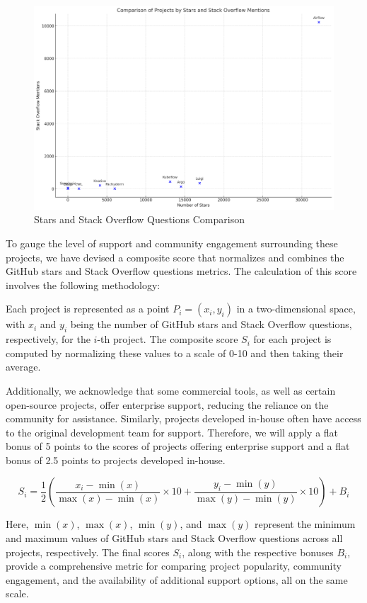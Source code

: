 \begin{figure}[htb]
    \centering
    \includegraphics[width=12cm]{graphics/Stars_stackoverflow_comparison.png}
    \caption[Stars and Stackoverflow Questions Comparison]{Stars and Stack Overflow Questions Comparison}
    \label{abb:stars_stackoverflow_comparison}
\end{figure}

To gauge the level of support and community engagement surrounding these projects, we have devised a composite score that normalizes and combines the GitHub stars and Stack Overflow questions metrics. The calculation of this score involves the following methodology:

Each project is represented as a point \(P_i = (x_i, y_i)\) in a two-dimensional space, with \(x_i\) and \(y_i\) being the number of GitHub stars and Stack Overflow questions, respectively, for the \(i\)-th project. The composite score \(S_i\) for each project is computed by normalizing these values to a scale of 0-10 and then taking their average.

Additionally, we acknowledge that some commercial tools, as well as certain open-source projects, offer enterprise support, reducing the reliance on the community for assistance. Similarly, projects developed in-house often have access to the original development team for support. Therefore, we will apply a flat bonus of 5 points to the scores of projects offering enterprise support and a flat bonus of 2.5 points to projects developed in-house.

\[
S_i = \frac{1}{2} \left( \frac{x_i - \min(x)}{\max(x) - \min(x)} \times 10 + \frac{y_i - \min(y)}{\max(y) - \min(y)} \times 10 \right) + B_i
\]

Here, \(\min(x)\), \(\max(x)\), \(\min(y)\), and \(\max(y)\) represent the minimum and maximum values of GitHub stars and Stack Overflow questions across all projects, respectively. The final scores \(S_i\), along with the respective bonuses \(B_i\), provide a comprehensive metric for comparing project popularity, community engagement, and the availability of additional support options, all on the same scale.

